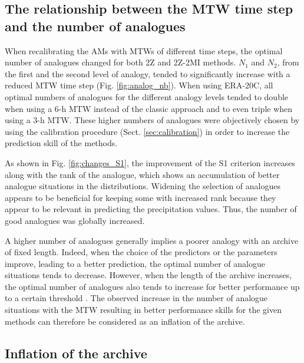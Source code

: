\documentclass[hess, manuscript]{copernicus}
\begin{document}
	
	\subsection{The relationship between the MTW time step and the number of analogues}
	\label{sec:increase_analognb}
	
	When recalibrating the AMs with MTWs of different time steps, the optimal number of analogues changed for both 2Z and 2Z-2MI methods. $N_{1}$ and $N_{2}$, from the first and the second level of analogy, tended to significantly increase with a reduced MTW time step (Fig. \ref{fig:analog_nb}). When using ERA-20C, all optimal numbers of analogues for the different analogy levels tended to double when using a 6-h MTW instead of the classic approach and to even triple when using a 3-h MTW. These higher numbers of analogues were objectively chosen by using the calibration procedure (Sect. \ref{sec:calibration}) in order to increase the prediction skill of the methods.
	
	As shown in Fig. \ref{fig:changes_S1}, the improvement of the S1 criterion increases along with the rank of the analogue, which shows an accumulation of better analogue situations in the distributions. Widening the selection of analogues appears to be beneficial for keeping some with increased rank because they appear to be relevant in predicting the precipitation values. Thus, the number of good analogues was globally increased.
	
	A higher number of analogues generally implies a poorer analogy with an archive of fixed length. Indeed, when the choice of the predictors or the parameters improve, leading to a better prediction, the optimal number of analogue situations tends to decrease. However, when the length of the archive increases, the optimal number of analogues also tends to increase for better performance up to a certain threshold \citep[][]{Bontron2004, Hamill2006a}. The observed increase in the number of analogue situations with the MTW resulting in better performance skills for the given methods can therefore be considered as an inflation of the archive.
	
	
	\subsection{Inflation of the archive}
	\label{sec:archive_reduction}
	
\end{document}
